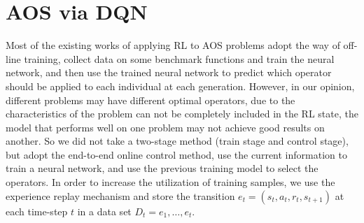 \documentclass[journal]{IEEEtran}
\begin{document}
\section{AOS via DQN}
Most of the existing works of applying RL to AOS problems adopt the way of off-line training, collect data on some benchmark functions and train the neural network, and then use the trained neural network to predict which operator should be applied to each individual at each generation.
% 
However, in our opinion, different problems may have different optimal operators, due to the characteristics of the problem can not be completely included in the RL state, the model that performs well on one problem may not achieve good results on another.
So we did not take a two-stage method (train stage and control stage), but adopt the end-to-end online control method, use the current information to train a neural network, and use the previous training model to select the operators.
In order to increase the utilization of training samples, we use the experience replay mechanism \cite{zha2019experience} and store the transition $e_t = (s_t,a_t,r_t,s_{t+1})$ at each time-step $t$ in a data set $D_t = {e_1,\dots, e_t}$.

\end{document}
